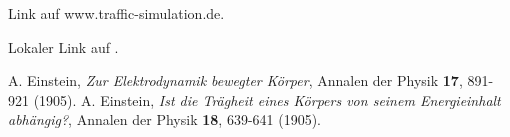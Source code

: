 \documentclass[12pt,a4paper]{scrartcl}
\begin{document}
Link auf 
{www.traffic-simulation.de}.

Lokaler Link auf
.





% 




%


\begin{thebibliography}{10}
A. Einstein, {\it Zur Elektrodynamik bewegter K\"orper}, 
Annalen der Physik {\bf 17}, 891-921 (1905).
A. Einstein, {\it Ist die Tr\"agheit eines K\"orpers von seinem 
Energieinhalt abh\"angig?}, Annalen der Physik {\bf 18}, 639-641 (1905).

\end{thebibliography}
\end{document}
